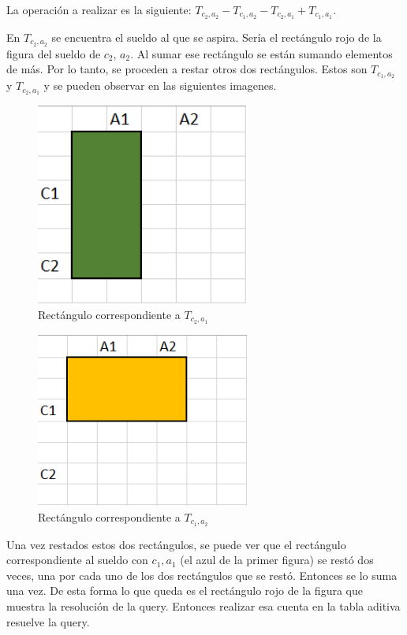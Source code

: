 La operación a realizar es la siguiente: $T_{c_2,a_2} - T_{c_1,a_2} - T_{c_2,a_1} + T_{c_1,a_1}$. 

En $T_{c_2,a_2}$ se encuentra el sueldo al que se aspira. Sería el rectángulo rojo de la figura del sueldo de $c_2$, $a_2$. Al sumar ese rectángulo se están sumando elementos de más. Por lo tanto, se proceden a restar otros dos rectángulos. Estos son  $T_{c_1,a_2}$ y $T_{c_2,a_1}$ y se pueden observar en las siguientes imagenes.

\begin{figure}[H]
\centering
\includegraphics[width=7cm]{Imagenes/Ej3d.png}
\caption{Rectángulo correspondiente a $T_{c_2,a_1}$}
\end{figure}

\begin{figure}[H]
\centering
\includegraphics[width=7cm]{Imagenes/Ej3e.png}
\caption{Rectángulo correspondiente a $T_{c_1,a_2}$}
\end{figure}

Una vez restados estos dos rectángulos, se puede ver que el rectángulo correspondiente al sueldo con $c_1,a_1$ (el azul de la primer figura) se restó dos veces, una por cada uno de los dos rectángulos que se restó. Entonces se lo suma una vez. De esta forma lo que queda es el rectángulo rojo de la figura que muestra la resolución de la query. Entonces realizar esa cuenta en la tabla aditiva resuelve la query.

